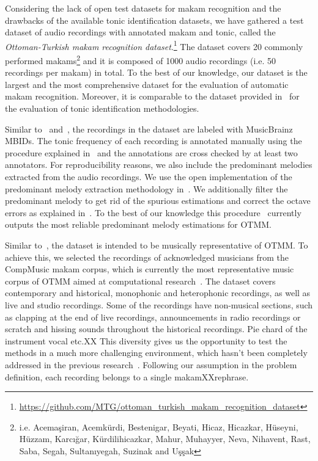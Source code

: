 \documentclass{sig-alternate}
\begin{document}
Considering the lack of open test datasets for makam re\-cognition and the drawbacks of the available tonic identification datasets, we have gathered a test dataset of audio recordings with annotated makam and tonic, called the \emph{Ottoman-Turkish makam recognition dataset}.\footnote{\url{https://github.com/MTG/ottoman_turkish_makam_recognition_dataset}} The data\-set covers 20 commonly performed makams\footnote{i.e. Acema\c{s}iran, Acemk\"{u}rdi, Bestenigar, Beyati, Hicaz, Hicazkar, H\"{u}seyni, H\"{u}zzam, Karc{\i}\u{g}ar, K\"{u}rdilihicazkar, Mahur, Muhayyer, Neva, Nihavent, Rast, Saba, Segah, Sultan{\i}yegah, Suzinak and U\c{s}\c{s}ak} and it is composed of 1000 audio recordings (i.e. 50 recordings per makam) in total. To the best of our knowledge, our dataset is the largest and the most comprehensive dataset for the evaluation of automatic makam re\-cognition. Moreover, it is comparable to the dataset provided in~\cite{atli2014makamFeature_atmm} for the evaluation of tonic identification methodologies.

Similar to~\cite{senturk2013karar_ismir} and~\cite{sercan_tonic}, the recordings in the dataset are labeled with MusicBrainz MBIDs. The tonic frequency of each recording is annotated manually using the procedure explained in~\cite{senturk2013karar_ismir} and the annotations are cross checked by at least two annotators. For reproducibility reasons, we also include the predominant melodies extracted from the audio recordings. We use the open implementation of the predominant melody extraction methodology in~\cite{atli2014makamFeature_atmm}. We additionally filter the predominant melody to get rid of the spurious estimations and correct the octave errors as explained in~\cite{bozkurt_tonic}. To the best of our knowledge this procedure~\cite{atli2014makamFeature_atmm} currently outputs the most reliable predominant melody estimations for OTMM. 

Similar to~\cite{bozkurt_makam}, the dataset is intended to be musically representative of OTMM. To achieve this, we selected the recordings of acknowledged musicians from the CompMusic makam corpus, which is currently the most representative music corpus of OTMM aimed at computational research~\cite{compmusic_corpus}. The dataset covers contemporary and historical, monophonic and heterophonic recordings, as well as live and studio recordings. Some of the recordings have non-musical sections, such as clapping at the end of live recordings, announcements in radio recordings or scratch and hissing sounds throughout the historical recordings. Pie chard of the instrument vocal etc.XX This diversity gives us the opportunity to test the methods in a much more challenging environment, which hasn't been completely addressed in the previous research~\cite{bozkurt_makam}. Following our assumption in the problem definition, each recording belongs to a single makamXXrephrase.
\end{document}
